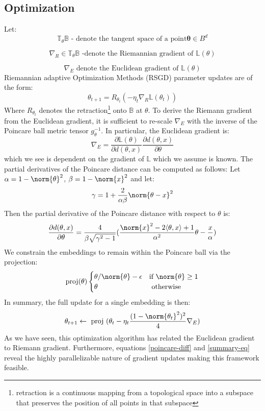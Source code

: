 \subsection{Optimization}
Let:
$$\mathbb{T}_\theta \mathbb{B} \text{ - denote the tangent space of a point} \mathbf{\theta} \in B^d$$ 

$$\nabla_R \in \mathbb{T}_\theta \mathbb{B} \text{ -denote the Riemannian gradient of } \mathbb{L}(\theta)$$

$$\nabla_E \text{ denote the Euclidean gradient of } \mathbb{L}(\theta)$$ 
Riemannian adaptive Optimization Methods (RSGD) parameter updates are of the form:
\begin{equation}
    \theta_{t+1} = R_{\theta_t}(-\eta_t \nabla_R \mathbb{L}(\theta_t))
\end{equation}
Where $R_{\theta_t}$ denotes the retraction\footnote[2]{retraction is a continuous mapping from a topological space into a subspace that preserves the position of all points in that subspace} onto $\mathbb{B}$ at $\theta$. To derive the Riemann gradient from the Euclidean gradient, it is sufficient to re-scale $\nabla_E$ with the inverse of the Poincare ball metric tensor $g_\theta^{-1}$. In particular, the Euclidean gradient is:
\begin{equation}
    \nabla_E = \frac{\partial \mathbb{L}(\theta)}{\partial d(\theta,x)}\frac{\partial d(\theta,x)}{\partial \theta}
\end{equation}
which we see is dependent on the gradient of $\mathbb{L}$ which we assume is known. The partial derivatives of the Poincare distance can be computed as follows: Let $\alpha = 1 - \norm{\theta}^2$, $\beta = 1-\norm{x}^2$ and let:
\begin{equation}
    \gamma = 1 + \frac{2}{\alpha \beta }\norm{\theta - x}^2
\end{equation}
Then the partial derivative of the Poincare distance with respect to $\theta$ is:
\begin{equation}
    \frac{\partial d(\theta,x)}{\partial \theta} = \frac{4}{\beta \sqrt{\gamma^2 -1}}(\frac{\norm{x}^2 -2\langle \theta , x \rangle +1}{\alpha^2}\theta - \frac{x}{\alpha}) \label{poincare-diff}
\end{equation}
We constrain the embeddings to remain within the Poincare ball via the projection:
\begin{equation}
\text{proj}(\theta)
    \begin{cases}
        \theta / \norm{\theta} - \epsilon &\text{if  }\norm{\theta} \geq 1 \\ 
        \theta & \text{  otherwise  }
    \end{cases}
\end{equation}
In summary, the full update for a single embedding is then:
\begin{equation}
    \theta_{t+1} \leftarrow \text{ proj }(\theta_t - \eta_t \frac{(1- \norm{\theta_t}^2)^2}{4}\nabla_E) \label{summary-eq} 
\end{equation}
As we have seen, this optimization algorithm has related the Euclidean gradient to Riemann gradient. Furthermore, equations \ref{poincare-diff} and \ref{summary-eq} reveal the highly parallelizable nature of gradient updates making this framework feasible.
